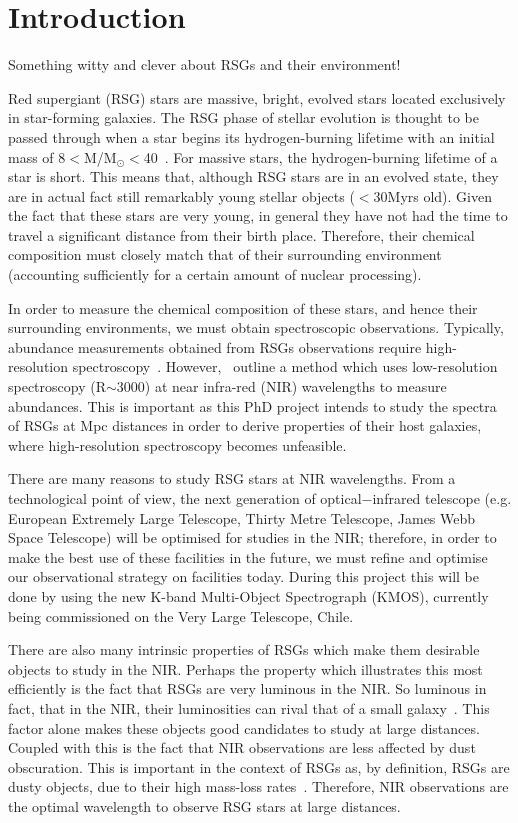 \chapter{Introduction}

Something witty and clever about RSGs and their environment!



Red supergiant (RSG) stars are massive, bright, evolved stars located exclusively in star-forming galaxies.
The RSG phase of stellar evolution is thought to be passed through when a star begins its hydrogen-burning lifetime with an initial mass of 8$<$M/M$_{\odot}<$40~\citep{Massey03, Crowther07, Meynet11}.
For massive stars, the hydrogen-burning lifetime of a star is short.
This means that, although RSG stars are in an evolved state, they are in actual fact still remarkably young stellar objects ($<$30Myrs old).
Given the fact that these stars are very young, in general they have not had the time to travel a significant distance from their birth place.
Therefore, their chemical composition must closely match that of their surrounding environment (accounting sufficiently for a certain amount of nuclear processing).


In order to measure the chemical composition of these stars, and hence their surrounding environments, we must obtain spectroscopic observations.
Typically, abundance measurements obtained from RSGs observations require high-resolution spectroscopy~\citep[R$\ge$ 20\,000;][]{Cunha07, Davies09a, Davies09b}.
However,~\cite{Davies10} outline a method which uses low-resolution spectroscopy (R$\sim$3000) at near infra-red (NIR) wavelengths to measure abundances.
This is important as this PhD project intends to study the spectra of RSGs at Mpc distances in order to derive properties of their host galaxies, where high-resolution spectroscopy becomes unfeasible.


There are many reasons to study RSG stars at NIR wavelengths.
From a technological point of view, the next generation of optical$-$infrared telescope (e.g. European Extremely Large Telescope, Thirty Metre Telescope, James Webb Space Telescope) will be optimised for studies in the NIR; therefore, in order to make the best use of these facilities in the future, we must refine and optimise our observational strategy on facilities today.
During this project this will be done by using the new K-band Multi-Object Spectrograph (KMOS), currently being commissioned on the Very Large Telescope, Chile.


There are also many intrinsic properties of RSGs which make them desirable objects to study in the NIR.
Perhaps the property which illustrates this most efficiently is the fact that RSGs are very luminous in the NIR.
So luminous in fact, that in the NIR, their luminosities can rival that of a small galaxy~\citep{Davies10}.
This factor alone makes these objects good candidates to study at large distances.
Coupled with this is the fact that NIR observations are less affected by dust obscuration.
This is important in the context of RSGs as, by definition, RSGs are dusty objects, due to their high mass-loss rates~\citep[e.g.][]{Danchi94}.
Therefore, NIR observations are the optimal wavelength to observe RSG stars at large distances.


